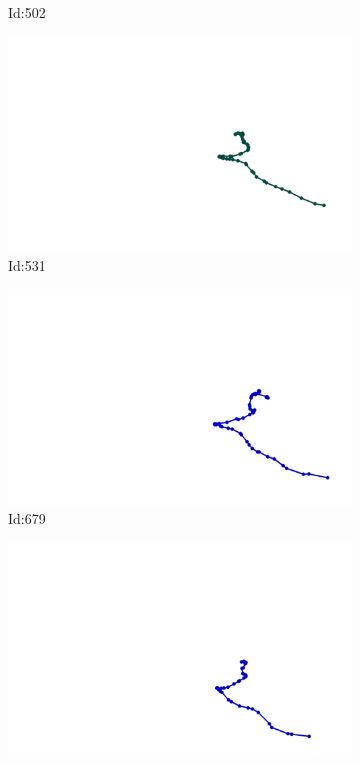 \documentclass[12pt,twoside]{report}
\begin{document}
\begin{figure}
\begin{subfigure}[b]{0.20\textwidth}
\caption{Id:502}
\end{subfigure}
\begin{subfigure}[b]{0.20\textwidth}
\centering
\includegraphics[width=\textwidth]{../../trajectories/531.png}
\caption{Id:531}
\end{subfigure}
\begin{subfigure}[b]{0.20\textwidth}
\centering
\includegraphics[width=\textwidth]{../../trajectories/679.png}
\caption{Id:679}
\end{subfigure}
\begin{subfigure}[b]{0.20\textwidth}
\centering
\includegraphics[width=\textwidth]{../../trajectories/798.png}

\end{subfigure}
\end{figure}
\end{document}

